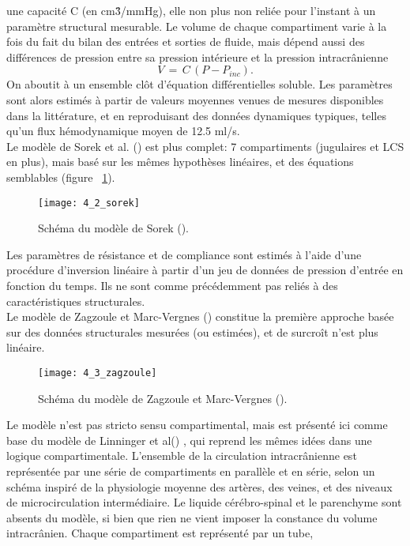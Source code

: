 une capacité C (en cm\^3/mmHg), elle non plus non reliée pour l'instant à un paramètre structural mesurable. Le volume
de chaque compartiment varie à la fois du fait du bilan des entrées et sorties de fluide, mais dépend
aussi des différences de pression entre sa pression intérieure et la pression intracrânienne
\begin{equation}
V\,=\,C\,(P-P_{inc }).
\end{equation}
On aboutit à un ensemble clôt d'équation différentielles soluble. Les paramètres sont alors estimés à
partir de valeurs moyennes venues de mesures disponibles dans la littérature, et en reproduisant des
données dynamiques typiques, telles qu'un flux hémodynamique moyen de 12.5 ml/s.\\
Le modèle de Sorek et al. (\cite{Sorek1988}) est plus complet: 7 compartiments (jugulaires et LCS en plus),
mais basé sur les mêmes hypothèses linéaires, et des équations semblables (figure ~\ref{fig:4_2_sorek}). 
\begin{figure}[!t]
\centering
\texttt{[image: 4\_2\_sorek]}
\caption{Schéma du modèle de Sorek (\cite{Sorek1988}).}
\label{fig:4_2_sorek}	
\end{figure}
Les paramètres de
résistance et de compliance sont estimés à l'aide d'une procédure d'inversion linéaire à partir d'un jeu
de données de pression d'entrée en fonction du temps. Ils ne sont comme précédemment pas reliés à
des caractéristiques structurales.\\
Le modèle de Zagzoule et Marc-Vergnes (\cite{Zagzoule1986}) constitue la première approche basée sur des
données structurales mesurées (ou estimées), et de surcroît n'est plus linéaire. 
\begin{figure}[!t]
\centering
\texttt{[image: 4\_3\_zagzoule]}
\caption{Schéma du modèle de Zagzoule et Marc-Vergnes (\cite{Zagzoule1986}).}
\label{fig:4_3_zagzoule}	
\end{figure}
Le modèle n'est pas
stricto sensu compartimental, mais est présenté ici comme base du modèle de Linninger et al(\cite{Linninger2009}) , qui
reprend les mêmes idées dans une logique compartimentale. L'ensemble de la circulation
intracrânienne est représentée par une série de compartiments en parallèle et en série, selon un
schéma inspiré de la physiologie moyenne des artères, des veines, et des niveaux de microcirculation
intermédiaire. Le liquide cérébro-spinal et le parenchyme sont absents du modèle, si bien que rien ne
vient imposer la constance du volume intracrânien. Chaque compartiment est représenté par un tube,
